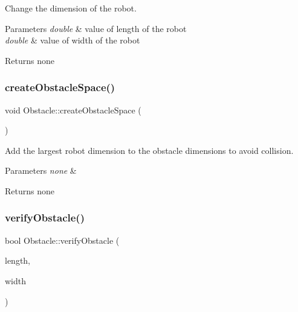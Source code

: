 Change the dimension of the robot. 


\begin{DoxyParams}{Parameters}
{\em double} & value of length of the robot \\
\hline
{\em double} & value of width of the robot\\
\hline
\end{DoxyParams}
\begin{DoxyReturn}{Returns}
none 
\end{DoxyReturn}
\mbox{\label{class_obstacle_a40db91b4d2f9db3f8d04d20f285351c3}} 
\subsubsection{\texorpdfstring{create\+Obstacle\+Space()}{createObstacleSpace()}}
{\footnotesize\ttfamily void Obstacle\+::create\+Obstacle\+Space (\begin{DoxyParamCaption}{ }\end{DoxyParamCaption})}



Add the largest robot dimension to the obstacle dimensions to avoid collision. 


\begin{DoxyParams}{Parameters}
{\em none} & \\
\hline
\end{DoxyParams}
\begin{DoxyReturn}{Returns}
none 
\end{DoxyReturn}
\mbox{\label{class_obstacle_ad0577b47e82c3df46d907df870549645}} 
\subsubsection{\texorpdfstring{verify\+Obstacle()}{verifyObstacle()}}
{\footnotesize\ttfamily bool Obstacle\+::verify\+Obstacle (\begin{DoxyParamCaption}\item[{double}]{length,  }\item[{double}]{width }\end{DoxyParamCaption})}



